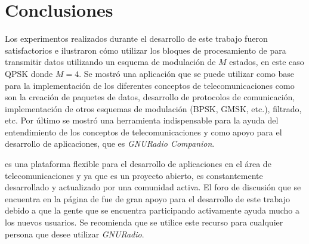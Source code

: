 
\chapter{Conclusiones}
Los experimentos realizados durante el desarrollo de este trabajo fueron satisfactorios e ilustraron c\'omo utilizar los bloques
de procesamiento de \gnuradio para transmitir datos utilizando un esquema de modulaci\'on de $M$ estados, en este caso QPSK donde
$M=4$. Se mostr\'o una aplicaci\'on que se puede utilizar como base para la implementaci\'on de los diferentes conceptos de
telecomunicaciones como son la creaci\'on de paquetes de datos, desarrollo de protocolos de comunicaci\'on, implementaci\'on de
otros esquemas de modulaci\'on (BPSK, GMSK, etc.), filtrado, etc. Por \'ultimo se mostr\'o una herramienta indispensable para la
ayuda del entendimiento de los conceptos de telecomunicaciones y como apoyo para el desarrollo de aplicaciones, que es
\emph{GNURadio Companion}.

\gnuradio es una plataforma flexible para el desarrollo de aplicaciones en el \'area de telecomunicaciones y ya que es
un proyecto abierto, es constantemente desarrollado y actualizado por una comunidad activa. El foro de discusi\'on que se
encuentra en la p\'agina de \gnuradio \cite{radio} fue de gran apoyo para el desarrollo de este trabajo debido a que la gente que
se encuentra participando activamente ayuda mucho a los nuevos usuarios. Se recomienda que se utilice este
recurso para cualquier persona que desee utilizar \emph{GNURadio}.


